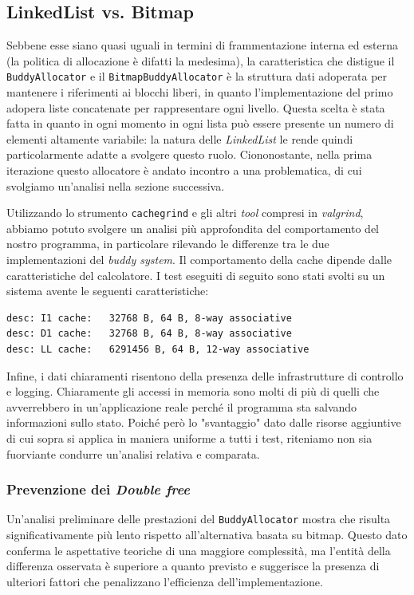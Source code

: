 \subsection{LinkedList vs. Bitmap}

Sebbene esse siano quasi uguali in termini di frammentazione interna ed esterna (la politica di allocazione è difatti la medesima), la caratteristica che distigue il \texttt{BuddyAllocator} e il \texttt{BitmapBuddyAllocator} è la struttura dati adoperata per mantenere i riferimenti ai blocchi liberi, in quanto l'implementazione del primo adopera liste concatenate per rappresentare ogni livello. Questa scelta è stata fatta in quanto in ogni momento in ogni lista può essere presente un numero di elementi altamente variabile: la natura delle \textit{LinkedList} le rende quindi particolarmente adatte a svolgere questo ruolo. Ciononostante, nella prima iterazione questo allocatore è andato incontro a una problematica, di cui svolgiamo un'analisi nella sezione successiva.

Utilizzando lo strumento \texttt{cachegrind} e gli altri \textit{tool} compresi in \textit{valgrind}, abbiamo potuto svolgere un analisi più approfondita del comportamento del nostro programma, in particolare rilevando le differenze tra le due implementazioni del \textit{buddy system}. Il comportamento della cache dipende dalle caratteristiche del calcolatore. I test eseguiti di seguito sono stati svolti su un sistema avente le seguenti caratteristiche:
\begin{lstlisting}[language={}]
desc: I1 cache:   32768 B, 64 B, 8-way associative
desc: D1 cache:   32768 B, 64 B, 8-way associative
desc: LL cache:   6291456 B, 64 B, 12-way associative
\end{lstlisting}

Infine, i dati chiaramenti risentono della presenza delle infrastrutture di controllo e logging. Chiaramente gli accessi in memoria sono molti di più di quelli che avverrebbero in un'applicazione reale perché il programma sta salvando informazioni sullo stato. Poiché però lo "svantaggio" dato dalle risorse aggiuntive di cui sopra si applica in maniera uniforme a tutti i test, riteniamo non sia fuorviante condurre un'analisi relativa e comparata.

\subsubsection*{Prevenzione dei \textit{Double free}}
Un'analisi preliminare delle prestazioni del \texttt{BuddyAllocator} mostra che risulta significativamente più lento rispetto all'alternativa basata su bitmap. Questo dato conferma le aspettative teoriche di una maggiore complessità, ma l'entità della differenza osservata è superiore a quanto previsto e suggerisce la presenza di ulteriori fattori che penalizzano l'efficienza dell'implementazione.

